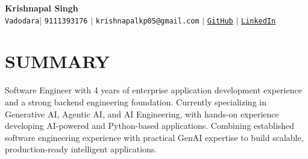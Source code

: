 \documentclass[letterpaper, 11pt]{article}
\begin{document}
	\begin{center}
		\textbf{\Huge Krishnapal Singh} \\
		\vspace{5pt}
		\vspace{5pt}
    \faMapMarker* \hspace{2pt}\texttt{Vadodara}$|$ 
		\small \faPhone* \texttt{9111393176} \hspace{1pt} $|$ \hspace{1pt} \faEnvelope
		\hspace{2pt} \texttt{krishnapalkp05@gmail.com} \hspace{1pt} $|$ \hspace{1pt}
        \faGithub \hspace{2pt} \href{https://github.com/kpsingh21} {\texttt{GitHub}}\hspace{1pt} $|$ \hspace{1pt}
        \faLinkedin \hspace{2pt} \href{https://www.linkedin.com/in/krishnapal-singh-chouhan-8a50a51aa}{\texttt{LinkedIn}}
		\vspace{}
	\end{center}


	\section{SUMMARY}
    Software Engineer with 4 years of enterprise application development experience and a strong backend engineering foundation. Currently specializing in Generative AI, Agentic AI, and AI Engineering, with hands-on experience developing AI-powered and Python-based applications. Combining established software engineering experience with practical GenAI expertise to build scalable, production-ready intelligent applications.
\end{document}

